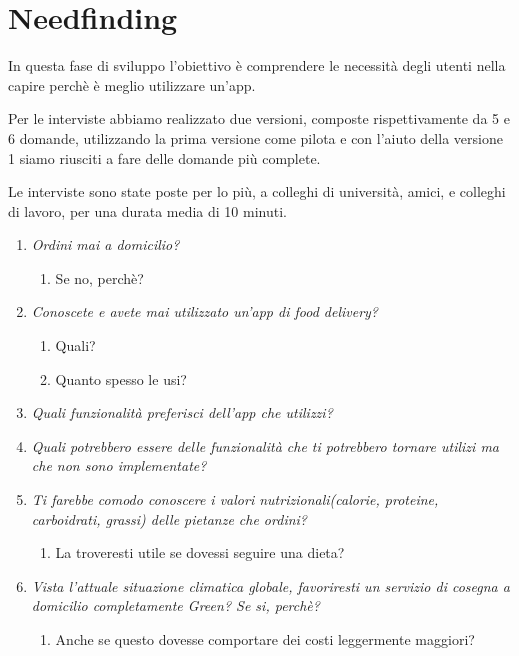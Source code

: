 \documentclass{article}
\begin{document}
\section{Needfinding} 
In questa fase di sviluppo l’obiettivo è comprendere le necessità degli utenti nella capire perchè è meglio utilizzare un'app.
    \vspace{1cm}
     \par
\par Per le interviste abbiamo realizzato due versioni, composte rispettivamente da 5 e 6 domande, utilizzando la prima versione come pilota e con l'aiuto della versione 1 siamo riusciti a fare delle domande più complete. \par Le interviste sono state poste per lo più, a colleghi di università, amici, e colleghi di lavoro, per una durata media di 10 minuti.\par
  \vspace{1cm}
\par{}
    \begin{enumerate}
    
     \item \textit{Ordini mai a domicilio?}
        \begin{enumerate}
            \item Se no, perchè?
        \end{enumerate}
     \item \textit{Conoscete e avete mai utilizzato un'app di food delivery?}
     \begin{enumerate}
         \item Quali?
         \item Quanto spesso le usi?
     \end{enumerate}
     \item \textit{Quali funzionalità preferisci dell'app che utilizzi?}
     \item \textit{Quali potrebbero essere delle funzionalità che ti potrebbero tornare utilizi ma che non sono implementate?}
    \item \textit{Ti farebbe comodo conoscere i valori nutrizionali(calorie, proteine, carboidrati, grassi) delle pietanze che ordini?}
    \begin{enumerate}
        \item La troveresti utile se dovessi seguire una dieta?
    \end{enumerate}
    \item \textit{Vista l'attuale situazione climatica globale, favoriresti un servizio di cosegna a domicilio completamente Green? Se si, perchè? }
    \begin{enumerate}
        \item Anche se questo dovesse comportare dei costi leggermente maggiori?
    \end{enumerate}
\end{enumerate}
\end{document}
